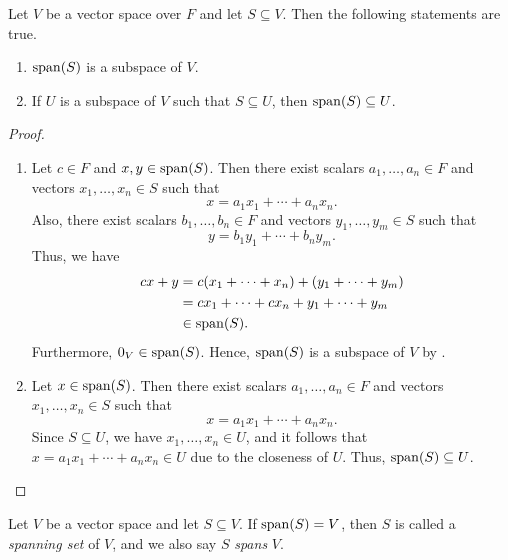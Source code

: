 \begin{theorem}\label{thm:span}
  Let $V$ be a vector space over $F$ and let $S \subseteq V$.
  Then the following statements are true.
  \begin{enumerate}
    \item $\operatorname{span}(S)$ is a subspace of $V$.
    \item If $U$ is a subspace of $V$ such that $S \subseteq U$, then
      $\operatorname{span}(S) \subseteq U$.
  \end{enumerate}
\end{theorem}
\begin{proof}
  \leavevmode
  \begin{enumerate}
    \item Let $c \in F$ and $x, y \in \operatorname{span}(S)$.
      Then there exist scalars $a_1, \dots, a_n \in F$
      and vectors $x_1, \dots, x_n \in S$ such that
      \begin{equation*}
        x = a_1x_1 + \cdots + a_nx_n.
      \end{equation*}
      Also, there exist scalars $b_1, \dots, b_n \in F$
      and vectors $y_1, \dots, y_m \in S$ such that
      \begin{equation*}
        y = b_1y_1 + \cdots + b_ny_m.
      \end{equation*}
      Thus, we have
      \begin{align*}
        cx + y
        &= c(x_1 + \cdots + x_n) + (y_1 + \cdots + y_m) \\
        &= cx_1 + \cdots + cx_n + y_1 + \cdots + y_m \\
        &\in \operatorname{span}(S).
      \end{align*}
      Furthermore, $0_V \in \operatorname{span}(S)$.
      Hence, $\operatorname{span}(S)$ is a subspace of $V$ by .
    \item Let $x \in \operatorname{span}(S)$.
      Then there exist scalars $a_1, \dots, a_n \in F$
      and vectors $x_1, \dots, x_n \in S$ such that
      \begin{equation*}
        x = a_1x_1 + \cdots + a_nx_n.
      \end{equation*}
      Since $S \subseteq U$, we have $x_1, \dots, x_n \in U$, and it follows that
      $x = a_1x_1 + \cdots + a_nx_n \in U$ due to the closeness of $U$.
      Thus, $\operatorname{span}(S) \subseteq U$. \qedhere
  \end{enumerate}
\end{proof}

\begin{definition}\label{def:spanning-set}
  Let $V$ be a vector space and let $S \subseteq V$.
  If $\operatorname{span}(S) = V$, then $S$ is called a \emph{spanning set} of $V$, and we
  also say $S$ \emph{spans} $V$.
\end{definition}

